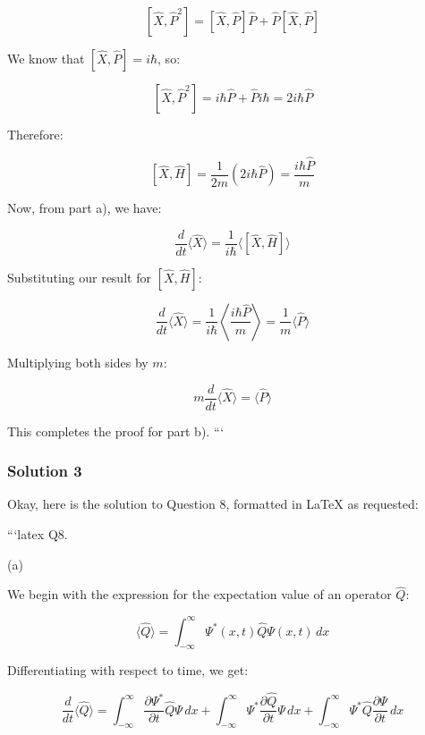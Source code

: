 \documentclass{article}
\begin{document}
\[
[\hat{X}, \hat{P}^2] = [\hat{X}, \hat{P}] \hat{P} + \hat{P} [\hat{X}, \hat{P}]
\]

\noindent We know that $[\hat{X}, \hat{P}] = i\hbar$, so:

\[
[\hat{X}, \hat{P}^2] = i\hbar \hat{P} + \hat{P} i\hbar = 2i\hbar \hat{P}
\]

\noindent Therefore:

\[
[\hat{X}, \hat{H}] = \frac{1}{2m} (2i\hbar \hat{P}) = \frac{i\hbar \hat{P}}{m}
\]

\noindent Now, from part a), we have:

\[
\frac{d}{dt} \langle \hat{X} \rangle = \frac{1}{i\hbar} \langle [\hat{X}, \hat{H}] \rangle
\]

\noindent Substituting our result for $[\hat{X}, \hat{H}]$:

\[
\frac{d}{dt} \langle \hat{X} \rangle = \frac{1}{i\hbar} \left\langle \frac{i\hbar \hat{P}}{m} \right\rangle = \frac{1}{m} \langle \hat{P} \rangle
\]

\noindent Multiplying both sides by $m$:

\[
m \frac{d}{dt} \langle \hat{X} \rangle = \langle \hat{P} \rangle
\]

\noindent This completes the proof for part b).
```

\subsubsection{Solution 3}
Okay, here is the solution to Question 8, formatted in LaTeX as requested:

```latex
\noindent Q8.

\noindent (a)

\noindent We begin with the expression for the expectation value of an operator $\hat{Q}$:

\begin{equation}
\langle \hat{Q} \rangle = \int_{-\infty}^{\infty} \Psi^*(x,t) \hat{Q} \Psi(x,t) \, dx
\end{equation}

\noindent Differentiating with respect to time, we get:

\begin{equation}
\frac{d}{dt} \langle \hat{Q} \rangle = \int_{-\infty}^{\infty} \frac{\partial \Psi^*}{\partial t} \hat{Q} \Psi \, dx + \int_{-\infty}^{\infty} \Psi^* \frac{\partial \hat{Q}}{\partial t} \Psi \, dx + \int_{-\infty}^{\infty} \Psi^* \hat{Q} \frac{\partial \Psi}{\partial t} \, dx
\end{equation}
\end{document}
